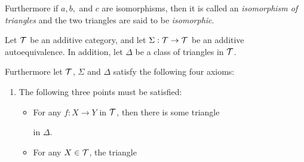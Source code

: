 \begin{definition}[Triangles]
\begin{center}
    \end{center}
    Furthermore if \( a, b, \) and \( c \) are isomorphisms, then it is called an \emph{isomorphism of triangles} and the two triangles are said to be \emph{isomorphic}.
\end{definition}

\begin{definition}
    Let \( {\mathcal{T}} \) be an additive category, and let \( \Sigma: {\mathcal{T}} \to {\mathcal{T}} \) be an additive autoequivalence. In addition, let \( \Delta \) be a class of triangles in \( {\mathcal{T}} \).

    Furthermore let \( {\mathcal{T}} \), \( \Sigma \) and \( \Delta \) satisfy the following four axioms:
    \begin{enumerate}[label={(\bfseries T\arabic*)}]
        \item {
            The following three points must be satisfied:
            \begin{itemize}
                \item {
                    For any \( f: X \to Y \) in \( {\mathcal{T}} \), then there is some triangle
                    \begin{center}
                    \end{center}
                    in \( \Delta \).
                }
                \item {
                    For any \( X \in {\mathcal{T}} \), the triangle
                    \begin{center}
\end{center}}
\end{itemize}}
\end{enumerate}
\end{definition}
